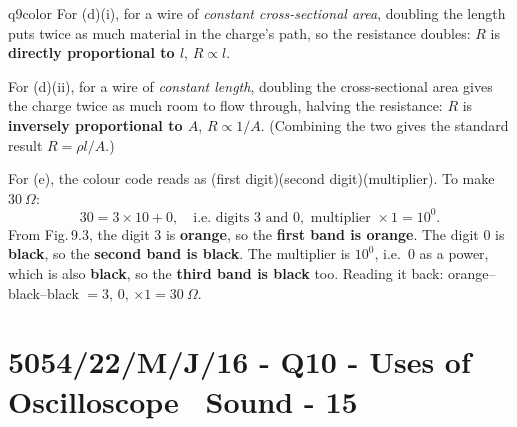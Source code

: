 \documentclass[11pt,a4paper]{article}
\newcommand{\examq}[4]{\section[#1 - Q#2]{#1 - Q#2 - #3 - #4}}
\begin{document}
\begin{ansbox}{q9color}
For (d)(i), for a wire of \emph{constant cross-sectional area}, doubling the length puts twice as much material in the charge's path, so the resistance doubles: $R$ is \textbf{directly proportional to $l$}, $R \propto l$.

For (d)(ii), for a wire of \emph{constant length}, doubling the cross-sectional area gives the charge twice as much room to flow through, halving the resistance: $R$ is \textbf{inversely proportional to $A$}, $R \propto 1/A$. (Combining the two gives the standard result $R = \rho l / A$.)

For (e), the colour code reads as (first digit)(second digit)(multiplier). To make $30\ \Omega$:
\[ 30 = 3 \times 10 + 0, \quad \text{i.e.\ digits } 3 \text{ and } 0, \text{ multiplier } \times 1 = 10^{0}. \]
From Fig.\,9.3, the digit $3$ is \textbf{orange}, so the \textbf{first band is orange}. The digit $0$ is \textbf{black}, so the \textbf{second band is black}. The multiplier is $10^0$, i.e.\ $0$ as a power, which is also \textbf{black}, so the \textbf{third band is black} too. Reading it back: orange--black--black $= 3$, $0$, $\times 1 = 30\ \Omega$.
\end{ansbox}

\examq{5054/22/M/J/16}{10}{Uses of Oscilloscope \textperiodcentered\ Sound}{15}
\end{document}
